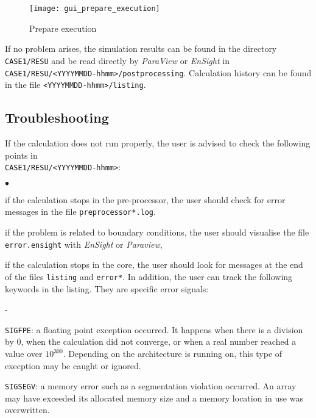 \begin{figure}[!ht]
\begin{center}
\texttt{[image: gui\_prepare\_execution]}
\caption{Prepare execution}
\label{fig43_e1}
\end{center}
\end{figure}

If no problem arises, the simulation results can be found in the directory \texttt{CASE1/RESU} and be read directly by {\em ParaView} or {\em EnSight} in \texttt{CASE1/RESU/<YYYYMMDD-hhmm>/postprocessing}. Calculation history can be found in the file \texttt{<YYYYMMDD-hhmm>/listing}.

\subsection{Troubleshooting}
If the calculation does not run properly, the user is advised to check the
following points in\\
\texttt{CASE1/RESU/<YYYYMMDD-hhmm>}:
\begin{list}{$\bullet$}{}
\item  if the calculation stops in the pre-processor, the user should check for error messages in the file \texttt{preprocessor*.log}.
\item if the problem is related to boundary conditions, the user should visualise the file \texttt{error.ensight} with {\em EnSight} or {\em Paraview},
\item if the calculation stops in the \CS core, the user should look for messages at the end of the files \texttt{listing} and \texttt{error*}. In addition, the user can track the following keywords in the listing. They are specific error signals:
  \begin{list}{-}{}
  \item  \texttt{SIGFPE}: a floating point exception occurred. It happens when there is a division by 0, when the calculation did not converge, or when a real number reached a value over $10^{300}$. Depending on the architecture \CS is running
on, this type of execption may be caught or ignored.
  \item  \texttt{SIGSEGV}: a memory error such as a segmentation violation occurred. An array may have exceeded its allocated memory size and a memory location in use was overwritten.
  \end{list}
\end{list}
